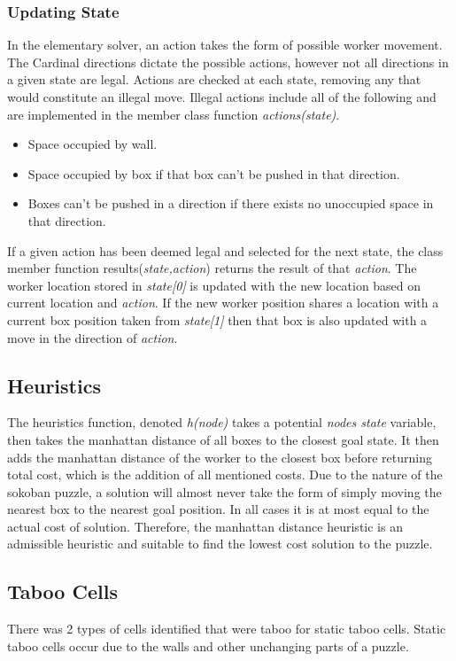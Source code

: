 \documentclass[]{article}
\begin{document}
\subsubsection{Updating State}
In the elementary solver, an action takes the form of possible worker movement. The Cardinal directions dictate the possible actions, however not all directions in a given state are legal. Actions are checked at each state, removing any that would constitute an illegal move. Illegal actions include all of the following and are implemented in the member class function \textit{actions(state)}.
\begin{itemize}
	\item Space occupied by wall.
	\item Space occupied by box if that box can't be pushed in that direction.
	\item Boxes can't be pushed in a direction if there exists no unoccupied space in that direction.
\end{itemize}
If a given action has been deemed legal and selected for the next state, the class member function results(\textit{state,action}) returns the result of that \textit{action}. The worker location stored in \textit{state[0]} is updated with the new location based on current location and \textit{action}. If the new worker position shares a location with a current box position taken from \textit{state[1]} then that box is also updated with a move in the direction of \textit{action}.
\subsection{Heuristics}
The heuristics function, denoted \textit{h(node)} takes a potential \textit{nodes state} variable, then takes the manhattan distance of all boxes to the closest goal state. It then adds the manhattan distance of the worker to the closest box before returning total cost, which is the addition of all mentioned costs. Due to the nature of the sokoban puzzle, a solution will almost never take the form of simply moving the nearest box to the nearest goal position. In all cases it is at most equal to the actual cost of solution. Therefore, the manhattan distance heuristic is an admissible heuristic and suitable to find the lowest cost solution to the puzzle. 
\subsection{Taboo Cells}
There was 2 types of cells identified that were taboo for static taboo cells. Static taboo cells occur due to the walls and other unchanging parts of a puzzle.
\end{document}
